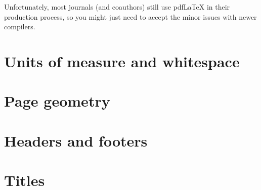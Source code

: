 \begin{practices}
Unfortunately, most journals (and coauthors)
still use pdfLaTeX in their production process,
so you might just need to accept the minor issues with newer compilers.
\end{practices}


%
%
%
\section{Units of measure and whitespace}


\section{Page geometry}



\section{Headers and footers}

\section{Titles}
